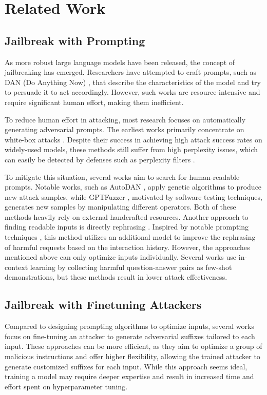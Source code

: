 \section{Related Work}
\subsection{Jailbreak with Prompting}
\label{sec:prompt}

As more robust large language models have been released, the concept of jailbreaking has emerged. Researchers have attempted to craft prompts, such as DAN (Do Anything Now) \cite{Shen2023DoAN}, that describe the characteristics of the model and try to persuade it to act accordingly. However, such works \cite{Shen2023DoAN,Shah2023ScalableAT,Wei2023JailbrokenHD} are resource-intensive and require significant human effort, making them inefficient.

To reduce human effort in attacking, most research focuses on automatically generating adversarial prompts. The earliest works primarily concentrate on white-box attacks \cite{Zou2023UniversalAT,Guo2021GradientbasedAA,Shin2020ElicitingKF}. Despite their success in achieving high attack success rates on widely-used models, these methods still suffer from high perplexity issues, which can easily be detected by defenses such as perplexity filters \cite{Alon2023DetectingLM}.
 
To mitigate this situation, several works aim to search for human-readable prompts. Notable works, such as AutoDAN \cite{Liu2023AutoDANGS}, apply genetic algorithms to produce new attack samples, while GPTFuzzer \cite{Yu2023GPTFUZZERRT}, motivated by software testing techniques, generates new samples by manipulating different operators. Both of these methods heavily rely on external handcrafted resources. Another approach to finding readable inputs is directly rephrasing \cite{Chao2023JailbreakingBB,Mehrotra2023TreeOA}. Inspired by notable prompting techniques \cite{Wei2022ChainOT,Yao2023TreeOT}, this method utilizes an additional model to improve the rephrasing of harmful requests based on the interaction history. However, the approaches mentioned above can only optimize inputs individually. Several works \cite{Wei2023JailbreakAG,AnilManyshotJ} use in-context learning \cite{Brown2020LanguageMA} by collecting harmful question-answer pairs as few-shot demonstrations, but these methods result in lower attack effectiveness.

\subsection{Jailbreak with Finetuning Attackers}
Compared to designing prompting algorithms to optimize inputs, several works \cite{Paulus2024AdvPrompterFA,Xie2024JailbreakingAA,Basani2024GASPEB,Wang2024DiffusionAttackerDP} focus on fine-tuning an attacker to generate adversarial suffixes tailored to each input. These approaches can be more efficient, as they aim to optimize a group of malicious instructions and offer higher flexibility, allowing the trained attacker to generate customized suffixes for each input. While this approach seems ideal, training a model may require deeper expertise and result in increased time and effort spent on hyperparameter tuning.

